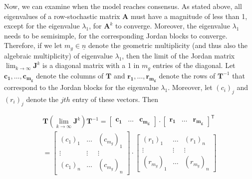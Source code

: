 \documentclass[journal,compsoc,10pt]{IEEEtran}
\newcommand{\RR}{\mathbb{R}}
\newcommand{\T}{\mathsf{T}}            %
\renewcommand{\vec}[1]{\bm{#1}}        %
\newcommand{\mat}[1]{\bm{#1}}          %
\newcommand{\ones}{\bm{1}}             %
\newtheorem{theorem}{Theorem}[section]
\begin{document}

Now, we can examine when the model reaches consensus. As stated above, all eigenvalues of a row-stochastic matrix $\mat A$ must have a magnitude of less than 1, except for the eigenvalue $\lambda_1$, for $\mat A^k$ to converge. Moreover, the eigenvalue $\lambda_1$ needs to be semisimple, for the corresponding Jordan blocks to converge.
Therefore, if we let $m_g \in \underline{n}$ denote the geometric multiplicity (and thus also the algebraic multiplicity) of eigenvalue $\lambda_1$, then the limit of the Jordan matrix $\lim_{k\rightarrow\infty}\mat J^k$ is a diagonal matrix with a 1 in $m_g$ entries of the diagonal.
Let $\vec{c_1},\dots,\vec{c_{m_g}}$ denote the columns of $\mat T$ and $\vec{r_1},\dots,\vec{r_{m_g}}$ denote the rows of $\mat T^{-1}$ that correspond to the Jordan blocks for the eigenvalue $\lambda_1$. Moreover, let $(c_{i})_j$ and $(r_{i})_j$ denote the $jth$ entry of these vectors. Then

\begin{multline} \label{eq:col_row_A^k}
    \mat T(\lim_{k\rightarrow\infty}\mat J^k)\mat T^{-1} = \begin{bmatrix}
        \vec{c_{1}} & \dots & \vec{c_{{m_g}}}
    \end{bmatrix}\cdot
    \begin{bmatrix}
        \vec{r_{1}} & \dots & \vec{r_{{m_g}}}
    \end{bmatrix}^{\T}\\
    = \begin{bmatrix}
        (c_{1})_1& \dots & (c_{{m_g}})_1\\
        \vdots & \vdots & \vdots\\
        (c_{1})_n & \dots & (c_{{m_g}})_n
    \end{bmatrix}\cdot
    \begin{bmatrix}
        (r_{1})_1 & \dots & (r_{1})_n\\
        \vdots & \vdots & \vdots\\
        (r_{{m_g}})_1 & \dots & (r_{{m_g}})_n
    \end{bmatrix}
\end{multline}
\end{document}
